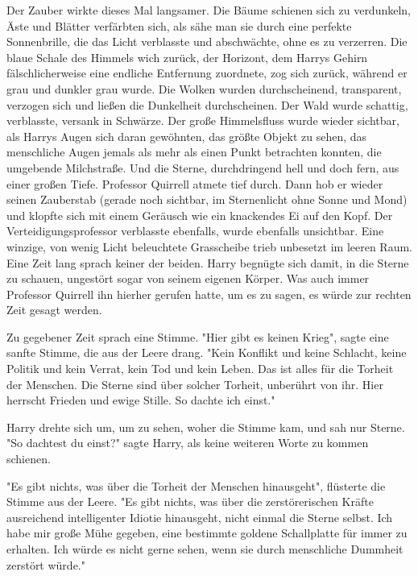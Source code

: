 {Der Zauber wirkte dieses Mal langsamer. Die Bäume schienen sich zu verdunkeln, Äste und Blätter verfärbten sich, als sähe man sie durch eine perfekte Sonnenbrille, die das Licht verblasste und abschwächte, ohne es zu verzerren. Die blaue Schale des Himmels wich zurück, der Horizont, dem Harrys Gehirn fälschlicherweise eine endliche Entfernung zuordnete, zog sich zurück, während er grau und dunkler grau wurde. Die Wolken wurden durchscheinend, transparent, verzogen sich und ließen die Dunkelheit durchscheinen. Der Wald wurde schattig, verblasste, versank in Schwärze. Der große Himmelsfluss wurde wieder sichtbar, als Harrys Augen sich daran gewöhnten, das größte Objekt zu sehen, das menschliche Augen jemals als mehr als einen Punkt betrachten konnten, die umgebende Milchstraße. Und die Sterne, durchdringend hell und doch fern, aus einer großen Tiefe. Professor Quirrell atmete tief durch. Dann hob er wieder seinen Zauberstab (gerade noch sichtbar, im Sternenlicht ohne Sonne und Mond) und klopfte sich mit einem Geräusch wie ein knackendes Ei auf den Kopf. Der Verteidigungsprofessor verblasste ebenfalls, wurde ebenfalls unsichtbar. Eine winzige, von wenig Licht beleuchtete Grasscheibe trieb unbesetzt im leeren Raum. Eine Zeit lang sprach keiner der beiden. Harry begnügte sich damit, in die Sterne zu schauen, ungestört sogar von seinem eigenen Körper. Was auch immer Professor Quirrell ihn hierher gerufen hatte, um es zu sagen, es würde zur rechten Zeit gesagt werden.

Zu gegebener Zeit sprach eine Stimme. "Hier gibt es keinen Krieg", sagte eine sanfte Stimme, die aus der Leere drang. "Kein Konflikt und keine Schlacht, keine Politik und kein Verrat, kein Tod und kein Leben. Das ist alles für die Torheit der Menschen. Die Sterne sind über solcher Torheit, unberührt von ihr. Hier herrscht Frieden und ewige Stille. So dachte ich einst."

Harry drehte sich um, um zu sehen, woher die Stimme kam, und sah nur Sterne.\\ "So dachtest du einst?" sagte Harry, als keine weiteren Worte zu kommen schienen.

"Es gibt nichts, was über die Torheit der Menschen hinausgeht", flüsterte die Stimme aus der Leere. "Es gibt nichts, was über die zerstörerischen Kräfte ausreichend intelligenter Idiotie hinausgeht, nicht einmal die Sterne selbst. Ich habe mir große Mühe gegeben, eine bestimmte goldene Schallplatte für immer zu erhalten. Ich würde es nicht gerne sehen, wenn sie durch menschliche Dummheit zerstört würde."

}
